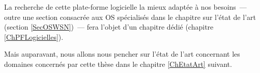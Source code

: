 La recherche de cette plate-forme logicielle la mieux adaptée à nos
besoins~--- outre une section consacrée aux OS spécialisés dans le chapitre
sur l'état de l'art (section \vref{SecOSWSN})~--- fera l'objet
d'un chapitre dédié (chapitre \ref{ChPFLogicielles}).

Mais auparavant, nous allons nous pencher sur l'état de l'art concernant les
domaines concernés par cette thèse dans le chapitre \ref{ChEtatArt} suivant.






